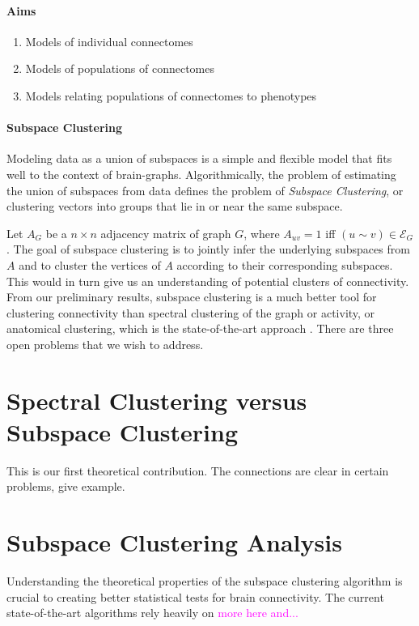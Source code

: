 \documentclass[times,11pt]{article} %
\newcommand{\laura}{\textcolor{magenta}}
\begin{document}
\clearpage
\paragraph{Aims}

\begin{enumerate}
	\item Models of individual connectomes
	\item Models of populations of connectomes
	\item Models relating populations of connectomes to phenotypes
\end{enumerate}



 

\newpage


\paragraph{Subspace Clustering}

Modeling data as a union of subspaces is a simple and flexible model that fits well to the context of brain-graphs.  Algorithmically, the problem of estimating the union of subspaces from data defines the problem of \emph{Subspace Clustering}, or clustering vectors into groups that lie in or near the same subspace. 


Let $A_G$ be a $n \times n$ adjacency matrix of graph $G$, where $A_{uv}=1$ iff $(u \sim v) \in \mathcal{E}_G$. 
The goal of subspace clustering is to jointly infer the underlying subspaces from $A$ and to cluster the vertices of $A$ according to their corresponding subspaces. This would in turn give us an understanding of potential clusters of connectivity. From our preliminary results, subspace clustering is a much better tool for clustering connectivity than spectral clustering of the graph or activity, or anatomical clustering, which is the state-of-the-art approach \cite{}. There are three open problems that we wish to address.

\section{Spectral Clustering versus Subspace Clustering}

This is our first theoretical contribution. The connections are clear in certain problems, give example.

\section{Subspace Clustering Analysis} Understanding the theoretical properties of the subspace clustering algorithm is crucial to creating better statistical tests for brain connectivity. The current state-of-the-art algorithms rely heavily on \laura{more here and...}
\end{document}
